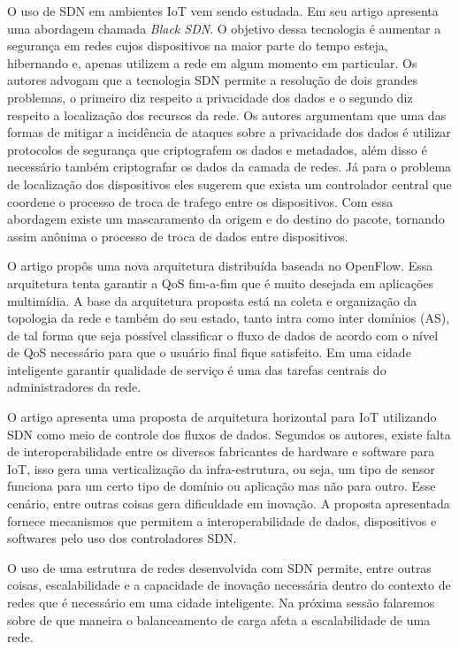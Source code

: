 \documentclass[12pt]{article}
\begin{document}
O uso de SDN em ambientes IoT vem sendo estudada. Em seu artigo \cite{7366932} apresenta uma abordagem chamada \textit{Black SDN}. O objetivo dessa tecnologia é aumentar a segurança em redes cujos dispositivos na maior parte do tempo esteja, hibernando e, apenas utilizem a rede em algum momento em particular. Os autores advogam que a tecnologia SDN permite a resolução de dois grandes problemas, o primeiro diz respeito a privacidade dos dados e o segundo diz respeito a localização dos recursos da rede. Os autores argumentam que uma das formas de mitigar a incidência de ataques sobre a privacidade dos dados é utilizar protocolos de segurança que criptografem os dados e metadados, além disso é necessário também criptografar os dados da camada de redes. Já para o problema de localização dos dispositivos eles sugerem que exista um controlador central que coordene o processo de troca de trafego entre os dispositivos. Com essa abordagem existe um mascaramento da origem e do destino do pacote, tornando assim anônima o processo de troca de dados entre dispositivos.

O artigo \cite{6819050} propôs uma nova arquitetura distribuída baseada no OpenFlow. Essa arquitetura tenta garantir a QoS fim-a-fim que é muito desejada em aplicações multimídia. A base da arquitetura proposta está na coleta e organização da topologia da rede e também do seu estado, tanto intra como inter domínios (AS), de tal forma que seja possível classificar o fluxo de dados de acordo com o nível de QoS necessário para que o usuário final fique satisfeito. Em uma cidade inteligente garantir qualidade de serviço é uma das tarefas centrais do administradores da rede.

O artigo \cite{Li2016} apresenta uma proposta de arquitetura horizontal para IoT utilizando SDN como meio de controle dos fluxos de dados. Segundos os autores, existe falta de interoperabilidade entre os diversos fabricantes de hardware e software para IoT, isso gera uma verticalização da infra-estrutura, ou seja, um tipo de sensor funciona para um certo tipo de domínio ou aplicação mas não para outro. Esse cenário, entre outras coisas gera dificuldade em inovação.  A proposta apresentada fornece mecanismos que permitem a interoperabilidade de dados, dispositivos e softwares pelo uso dos controladores SDN.

O uso de uma estrutura de redes desenvolvida com SDN permite, entre outras coisas, escalabilidade e a capacidade de inovação necessária dentro do contexto de redes que é necessário em uma cidade inteligente. Na próxima sessão falaremos sobre de que maneira o balanceamento de carga afeta a escalabilidade de uma rede.
\end{document}
